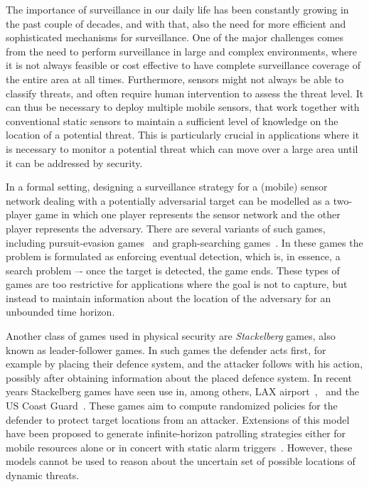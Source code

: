 The importance of surveillance in our daily life has been constantly growing in the past couple of decades, and with that, also the need for more efficient and sophisticated mechanisms for surveillance. One of the major challenges comes from the need to perform surveillance in large and complex environments, where it is not always feasible or cost effective to have complete surveillance coverage of the entire area at all times. Furthermore, sensors  might not always be able to classify threats, and often require human intervention to assess the threat level. It can thus be necessary to deploy multiple mobile sensors, that work together with conventional static sensors to maintain a sufficient level of knowledge on the location of a potential threat. This is particularly crucial in applications where it is necessary to monitor a potential threat which can move over a large area until it can be addressed by security.

In a formal setting, designing a surveillance strategy for a (mobile) sensor network dealing with a potentially adversarial target can be modelled as a two-player game in which one player represents the sensor network and the other player represents the adversary. There are several variants of such games, including pursuit-evasion games~\cite{Chung2011} and graph-searching games~\cite{Kreutzer11}. In these games the problem is formulated as enforcing eventual detection, which is, in essence, a search problem –- once the target is detected, the game ends. These types of games are too restrictive for applications where the goal is not to capture, but instead  to maintain information about the location of the adversary for an unbounded time horizon.

Another class of games used in physical security are \emph{Stackelberg} games, also known as leader-follower games. In such games the defender acts first, for example by placing their defence system, and the attacker follows with his action, possibly after obtaining information about the placed defence system. In recent years Stackelberg games have seen use in, among others, LAX airport~\cite{Pita08},~\cite{jain2012overview} and the US Coast Guard~\cite{An11}. These games aim to compute randomized policies for the defender to protect target locations from an attacker. Extensions of this model~\cite{Basilico12} have been proposed to generate infinite-horizon patrolling strategies either for mobile resources alone or in concert with static alarm triggers~\cite{basilico2016security,Munoz13}. However, these models cannot be used to reason about the uncertain set of possible  locations of dynamic threats.

